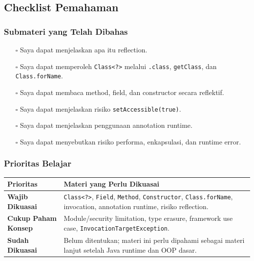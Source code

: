 \subsection{Checklist Pemahaman}

\subsubsection{Submateri yang Telah Dibahas}

\begin{itemize}
    \item[$\square$] Saya dapat menjelaskan apa itu reflection.
    \item[$\square$] Saya dapat memperoleh \texttt{Class<?>} melalui \texttt{.class}, \texttt{getClass}, dan \texttt{Class.forName}.
    \item[$\square$] Saya dapat membaca method, field, dan constructor secara reflektif.
    \item[$\square$] Saya dapat menjelaskan risiko \texttt{setAccessible(true)}.
    \item[$\square$] Saya dapat menjelaskan penggunaan annotation runtime.
    \item[$\square$] Saya dapat menyebutkan risiko performa, enkapsulasi, dan runtime error.
\end{itemize}

\subsubsection{Prioritas Belajar}

\begin{tabularx}{\textwidth}{|L{0.22\textwidth}|X|}
\hline
\textbf{Prioritas} & \textbf{Materi yang Perlu Dikuasai} \\
\hline
\textbf{Wajib Dikuasai} & \texttt{Class<?>}, \texttt{Field}, \texttt{Method}, \texttt{Constructor}, \texttt{Class.forName}, invocation, annotation runtime, risiko reflection. \\
\hline
\textbf{Cukup Paham Konsep} & Module/security limitation, type erasure, framework use case, \texttt{InvocationTargetException}. \\
\hline
\textbf{Sudah Dikuasai} & Belum ditentukan; materi ini perlu dipahami sebagai materi lanjut setelah Java runtime dan OOP dasar. \\
\hline
\end{tabularx}
